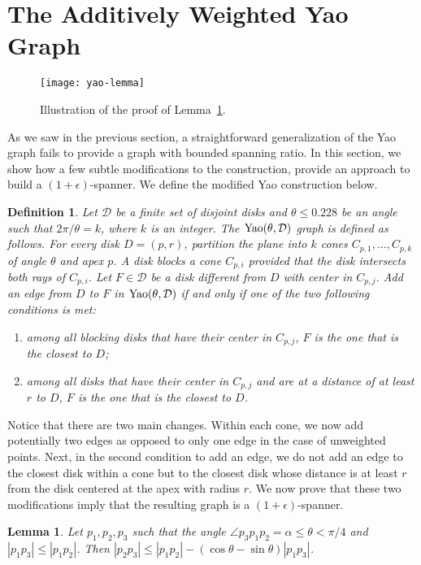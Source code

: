 \documentclass[pdftex,leqno,fleqn,12pt]{article}
\newcommand{\YAO}{{\rm{Yao}}}
\newtheorem{lemma}[theorem]{Lemma}
\newtheorem{definition}[theorem]{Definition}
\begin{document}
\section{The Additively Weighted Yao Graph}\label{section-yao}
\begin{figure} \centering\texttt{[image: yao-lemma]}\caption{Illustration of
the proof of Lemma~\ref{lemma-yao}.}\label{fig-lemma-yao} \end{figure}
As we saw in the previous section, a straightforward generalization of the
Yao graph fails to provide a graph with bounded spanning ratio. In this section,
we show how a few subtle modifications to the construction, provide
an approach to build a $(1+\epsilon)$-spanner. We define the modified
Yao construction below.
\begin{definition} Let $\mathcal{D}$ be a finite set of disjoint disks and
$\theta\leq 0.228$ be an angle such that $2\pi/\theta=k$, where $k$ is an
integer. The $\YAO(\theta,\mathcal{D})$ graph is defined as follows. For every
disk $D=(p,r)$, partition the plane into $k$ cones $C_{p,1},\ldots,C_{p,k}$ of
angle $\theta$ and apex $p$. A disk \emph{blocks} a cone $C_{p,i}$ provided
that the disk intersects both rays of $C_{p,i}$. Let $F\in \mathcal{D}$ be a
disk different from $D$ with center in $C_{p,j}$. Add an edge from $D$
to $F$ in $\YAO(\theta,\mathcal{D})$ if and only if one of the two following
conditions is met: \begin{enumerate} \item among all blocking disks that have
their center in $C_{p,j}$, $F$ is the one that is the closest to $D$; \item
among all disks that have their center in $C_{p,j}$ and are at a distance of at
least $r$ to $D$, $F$ is the one that is the closest to $D$.  \end{enumerate}
\end{definition}
Notice that there are two main changes. Within each cone, we now add
potentially two edges as opposed to only one edge in the case of unweighted
points. Next, in the second condition to add an edge, we do not add an edge to
the closest disk within a cone but to the closest disk whose distance is at
least $r$ from the disk centered at the apex with radius $r$. We now prove that
these two modifications imply that the resulting graph is a $(1 +
\epsilon)$-spanner.
\begin{lemma}\label{lemma-yao} Let $p_1,p_2,p_3$ such that the angle $\angle
p_3p_1p_2=\alpha\leq\theta<\pi/4$ and $|p_1p_3|\leq |p_1p_2|$. Then
$|p_2p_3|\leq |p_1p_2|-(\cos\theta-\sin\theta)|p_1p_3|$.  \end{lemma}
\end{document}

